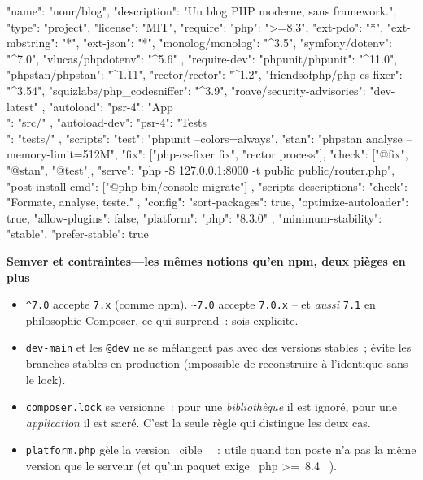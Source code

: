 \documentclass[12pt,a4paper,twoside,openright]{book}
\newcommand{\etape}[1]{\par\medskip\noindent\textbf{\large #1}\par\smallskip}
\begin{document}
\begin{codejson}
{
  "name": "nour/blog",
  "description": "Un blog PHP moderne, sans framework.",
  "type": "project",
  "license": "MIT",
  "require": {
    "php": ">=8.3",
    "ext-pdo": "*",
    "ext-mbstring": "*",
    "ext-json": "*",
    "monolog/monolog": "^3.5",
    "symfony/dotenv": "^7.0",
    "vlucas/phpdotenv": "^5.6"
  },
  "require-dev": {
    "phpunit/phpunit": "^11.0",
    "phpstan/phpstan": "^1.11",
    "rector/rector": "^1.2",
    "friendsofphp/php-cs-fixer": "^3.54",
    "squizlabs/php_codesniffer": "^3.9",
    "roave/security-advisories": "dev-latest"
  },
  "autoload": { "psr-4": { "App\\": "src/" } },
  "autoload-dev": { "psr-4": { "Tests\\": "tests/" } },
  "scripts": {
    "test": "phpunit --colors=always",
    "stan": "phpstan analyse --memory-limit=512M",
    "fix": ["php-cs-fixer fix", "rector process"],
    "check": ["@fix", "@stan", "@test"],
    "serve": "php -S 127.0.0.1:8000 -t public public/router.php",
    "post-install-cmd": ["@php bin/console migrate"]
  },
  "scripts-descriptions": { "check": "Formate, analyse, teste." },
  "config": {
    "sort-packages": true,
    "optimize-autoloader": true,
    "allow-plugins": false,
    "platform": { "php": "8.3.0" }
  },
  "minimum-stability": "stable",
  "prefer-stable": true
}
\end{codejson}

\etape{Semver et contraintes---les m\^emes notions qu'en npm, deux pi\`eges en plus}
\begin{itemize}
  \item \verb|^7.0| accepte \verb|7.x| (comme npm). \verb|~7.0| accepte \verb|7.0.x| -- et
        \emph{aussi} \verb|7.1| en philosophie Composer, ce qui surprend~: sois explicite.
  \item \verb|dev-main| et les \verb|@dev| ne se m\'elangent pas avec des versions stables~; \'evite
        les branches stables en production (impossible de reconstruire \`a l'identique sans le lock).
  \item \texttt{composer.lock} se versionne~: pour une \emph{biblioth\`eque} il est ignor\'e, pour une
        \emph{application} il est sacr\'e. C'est la seule r\`egle qui distingue les deux cas.
  \item \verb|platform.php| g\`ele la version \og ~cible~ \fg{}~: utile quand ton poste n'a pas la m\^eme
        version que le serveur (et qu'un paquet exige \og ~php \textgreater=~8.4~ \fg{}).
\end{itemize}
\end{document}
